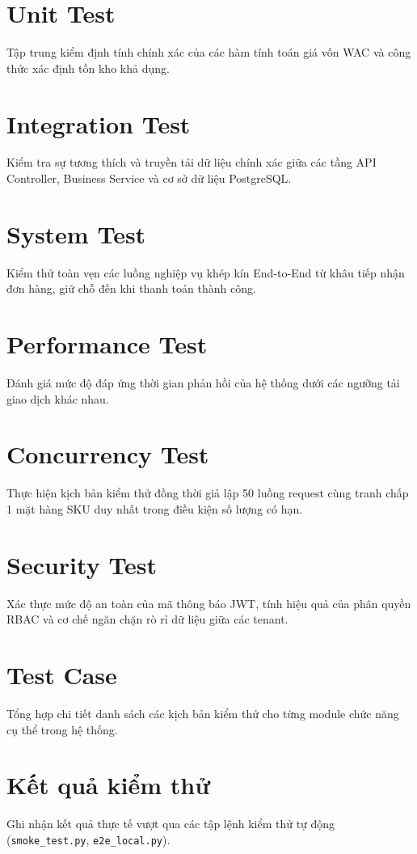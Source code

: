 \documentclass[12pt,a4paper]{report}
\begin{document}
	\section{Unit Test}
	Tập trung kiểm định tính chính xác của các hàm tính toán giá vốn WAC và công thức xác định tồn kho khả dụng.
	
	\section{Integration Test}
	Kiểm tra sự tương thích và truyền tải dữ liệu chính xác giữa các tầng API Controller, Business Service và cơ sở dữ liệu PostgreSQL.
	
	\section{System Test}
	Kiểm thử toàn vẹn các luồng nghiệp vụ khép kín End-to-End từ khâu tiếp nhận đơn hàng, giữ chỗ đến khi thanh toán thành công.
	
	\section{Performance Test}
	Đánh giá mức độ đáp ứng thời gian phản hồi của hệ thống dưới các ngưỡng tải giao dịch khác nhau.
	
	\section{Concurrency Test}
	Thực hiện kịch bản kiểm thử đồng thời giả lập 50 luồng request cùng tranh chấp 1 mặt hàng SKU duy nhất trong điều kiện số lượng có hạn.
	
	\section{Security Test}
	Xác thực mức độ an toàn của mã thông báo JWT, tính hiệu quả của phân quyền RBAC và cơ chế ngăn chặn rò rỉ dữ liệu giữa các tenant.
	
	\section{Test Case}
	Tổng hợp chi tiết danh sách các kịch bản kiểm thử cho từng module chức năng cụ thể trong hệ thống.
	
	\section{Kết quả kiểm thử}
	Ghi nhận kết quả thực tế vượt qua các tập lệnh kiểm thử tự động (\texttt{smoke\_test.py}, \texttt{e2e\_local.py}).
	
\end{document}
